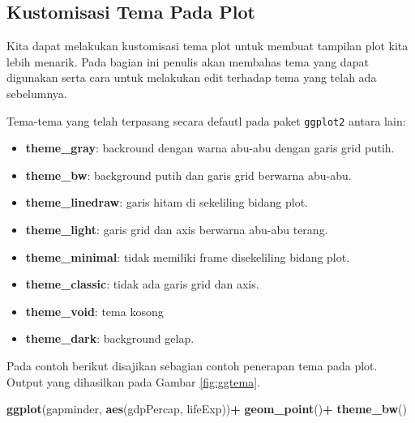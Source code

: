\documentclass[]{book}
\newenvironment{Shaded}{\begin{snugshade}}{\end{snugshade}}
\newcommand{\KeywordTok}[1]{\textcolor[rgb]{0.13,0.29,0.53}{\textbf{#1}}}
\newcommand{\StringTok}[1]{\textcolor[rgb]{0.31,0.60,0.02}{#1}}
\newcommand{\OperatorTok}[1]{\textcolor[rgb]{0.81,0.36,0.00}{\textbf{#1}}}
\newcommand{\NormalTok}[1]{#1}
\providecommand{\tightlist}{%
  \setlength{\itemsep}{0pt}\setlength{\parskip}{0pt}}
\begin{document}
\subsection{Kustomisasi Tema Pada
Plot}\label{kustomisasi-tema-pada-plot}

Kita dapat melakukan kustomisasi tema plot untuk membuat tampilan plot
kita lebih menarik. Pada bagian ini penulis akan membahas tema yang
dapat digunakan serta cara untuk melakukan edit terhadap tema yang telah
ada sebelumnya.

Tema-tema yang telah terpasang secara defautl pada paket
\texttt{ggplot2} antara lain:

\begin{itemize}
\tightlist
\item
  \textbf{theme\_gray}: backround dengan warna abu-abu dengan garis grid
  putih.
\item
  \textbf{theme\_bw}: background putih dan garis grid berwarna abu-abu.
\item
  \textbf{theme\_linedraw}: garis hitam di sekeliling bidang plot.
\item
  \textbf{theme\_light}: garis grid dan axis berwarna abu-abu terang.
\item
  \textbf{theme\_minimal}: tidak memiliki frame disekeliling bidang
  plot.
\item
  \textbf{theme\_classic}: tidak ada garis grid dan axis.
\item
  \textbf{theme\_void}: tema kosong
\item
  \textbf{theme\_dark}: background gelap.
\end{itemize}

Pada contoh berikut disajikan sebagian contoh penerapan tema pada plot.
Output yang dihasilkan pada Gambar \ref{fig:ggtema}.

\begin{Shaded}
\begin{Highlighting}[]
\KeywordTok{ggplot}\NormalTok{(gapminder, }\KeywordTok{aes}\NormalTok{(gdpPercap, lifeExp))}\OperatorTok{+}
\StringTok{  }\KeywordTok{geom_point}\NormalTok{()}\OperatorTok{+}
\StringTok{  }\KeywordTok{theme_bw}\NormalTok{()}
\end{Highlighting}
\end{Shaded}
\end{document}
